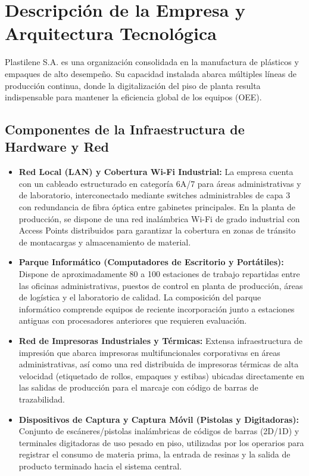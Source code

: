 	\section{Descripción de la Empresa y Arquitectura Tecnológica}
		Plastilene S.A. es una organización consolidada en la manufactura de plásticos y empaques de alto desempeño. Su capacidad instalada abarca múltiples líneas de producción continua, donde la digitalización del piso de planta resulta indispensable para mantener la eficiencia global de los equipos (OEE).
		
		\subsection{Componentes de la Infraestructura de Hardware y Red}
		\begin{itemize}
			\item \textbf{Red Local (LAN) y Cobertura Wi-Fi Industrial:} La empresa cuenta con un cableado estructurado en categoría 6A/7 para áreas administrativas y de laboratorio, interconectado mediante switches administrables de capa 3 con redundancia de fibra óptica entre gabinetes principales. En la planta de producción, se dispone de una red inalámbrica Wi-Fi de grado industrial con Access Points distribuidos para garantizar la cobertura en zonas de tránsito de montacargas y almacenamiento de material.
			\item \textbf{Parque Informático (Computadores de Escritorio y Portátiles):} Dispone de aproximadamente 80 a 100 estaciones de trabajo repartidas entre las oficinas administrativas, puestos de control en planta de producción, áreas de logística y el laboratorio de calidad. La composición del parque informático comprende equipos de reciente incorporación junto a estaciones antiguas con procesadores anteriores que requieren evaluación.
			\item \textbf{Red de Impresoras Industriales y Térmicas:} Extensa infraestructura de impresión que abarca impresoras multifuncionales corporativas en áreas administrativas, así como una red distribuida de impresoras térmicas de alta velocidad (etiquetado de rollos, empaques y estibas) ubicadas directamente en las salidas de producción para el marcaje con código de barras de trazabilidad.
			\item \textbf{Dispositivos de Captura y Captura Móvil (Pistolas y Digitadoras):} Conjunto de escáneres/pistolas inalámbricas de códigos de barras (2D/1D) y terminales digitadoras de uso pesado en piso, utilizadas por los operarios para registrar el consumo de materia prima, la entrada de resinas y la salida de producto terminado hacia el sistema central.
		\end{itemize}
		
